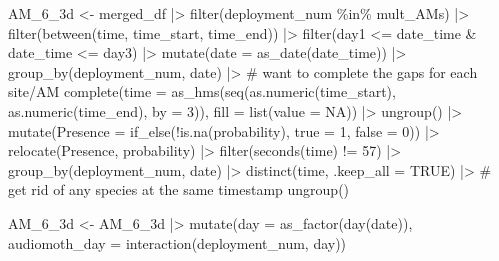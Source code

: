\documentclass[
  letterpaper,
  DIV=11,
  numbers=noendperiod]{scrartcl}
\newenvironment{Shaded}{\begin{snugshade}}{\end{snugshade}}
\newcommand{\AttributeTok}[1]{\textcolor[rgb]{0.40,0.45,0.13}{#1}}
\newcommand{\CommentTok}[1]{\textcolor[rgb]{0.37,0.37,0.37}{#1}}
\newcommand{\ConstantTok}[1]{\textcolor[rgb]{0.56,0.35,0.01}{#1}}
\newcommand{\DecValTok}[1]{\textcolor[rgb]{0.68,0.00,0.00}{#1}}
\newcommand{\FunctionTok}[1]{\textcolor[rgb]{0.28,0.35,0.67}{#1}}
\newcommand{\NormalTok}[1]{\textcolor[rgb]{0.00,0.23,0.31}{#1}}
\newcommand{\OtherTok}[1]{\textcolor[rgb]{0.00,0.23,0.31}{#1}}
\newcommand{\SpecialCharTok}[1]{\textcolor[rgb]{0.37,0.37,0.37}{#1}}
\begin{document}
\begin{Shaded}
\begin{Highlighting}[]
\NormalTok{AM\_6\_3d }\OtherTok{\textless{}{-}}\NormalTok{ merged\_df }\SpecialCharTok{|\textgreater{}} \FunctionTok{filter}\NormalTok{(deployment\_num }\SpecialCharTok{\%in\%}\NormalTok{ mult\_AMs) }\SpecialCharTok{|\textgreater{}} 
  \FunctionTok{filter}\NormalTok{(}\FunctionTok{between}\NormalTok{(time, time\_start, time\_end)) }\SpecialCharTok{|\textgreater{}}
  \FunctionTok{filter}\NormalTok{(day1 }\SpecialCharTok{\textless{}=}\NormalTok{ date\_time }\SpecialCharTok{\&}\NormalTok{ date\_time }\SpecialCharTok{\textless{}=}\NormalTok{ day3) }\SpecialCharTok{|\textgreater{}}
  \FunctionTok{mutate}\NormalTok{(}\AttributeTok{date =} \FunctionTok{as\_date}\NormalTok{(date\_time)) }\SpecialCharTok{|\textgreater{}} 
  \FunctionTok{group\_by}\NormalTok{(deployment\_num, date) }\SpecialCharTok{|\textgreater{}} \CommentTok{\# want to complete the gaps for each site/AM}
  \FunctionTok{complete}\NormalTok{(}\AttributeTok{time =} \FunctionTok{as\_hms}\NormalTok{(}\FunctionTok{seq}\NormalTok{(}\FunctionTok{as.numeric}\NormalTok{(time\_start), }\FunctionTok{as.numeric}\NormalTok{(time\_end), }\AttributeTok{by =} \DecValTok{3}\NormalTok{)), }
  \AttributeTok{fill =} \FunctionTok{list}\NormalTok{(}\AttributeTok{value =} \ConstantTok{NA}\NormalTok{)) }\SpecialCharTok{|\textgreater{}} 
    \FunctionTok{ungroup}\NormalTok{() }\SpecialCharTok{|\textgreater{}} 
    \FunctionTok{mutate}\NormalTok{(}\AttributeTok{Presence =} \FunctionTok{if\_else}\NormalTok{(}\SpecialCharTok{!}\FunctionTok{is.na}\NormalTok{(probability),}
    \AttributeTok{true =} \DecValTok{1}\NormalTok{,}
    \AttributeTok{false =} \DecValTok{0}\NormalTok{)) }\SpecialCharTok{|\textgreater{}} 
      \FunctionTok{relocate}\NormalTok{(Presence, probability) }\SpecialCharTok{|\textgreater{}} 
      \FunctionTok{filter}\NormalTok{(}\FunctionTok{seconds}\NormalTok{(time) }\SpecialCharTok{!=} \DecValTok{57}\NormalTok{) }\SpecialCharTok{|\textgreater{}} 
      \FunctionTok{group\_by}\NormalTok{(deployment\_num, date) }\SpecialCharTok{|\textgreater{}} 
      \FunctionTok{distinct}\NormalTok{(time, }\AttributeTok{.keep\_all =} \ConstantTok{TRUE}\NormalTok{) }\SpecialCharTok{|\textgreater{}} \CommentTok{\# get rid of any species at the same timestamp}
      \FunctionTok{ungroup}\NormalTok{()}

\NormalTok{AM\_6\_3d }\OtherTok{\textless{}{-}}\NormalTok{ AM\_6\_3d }\SpecialCharTok{|\textgreater{}} \FunctionTok{mutate}\NormalTok{(}\AttributeTok{day =} \FunctionTok{as\_factor}\NormalTok{(}\FunctionTok{day}\NormalTok{(date)),}
\AttributeTok{audiomoth\_day =} \FunctionTok{interaction}\NormalTok{(deployment\_num, day))}


\end{Highlighting}
\end{Shaded}
\end{document}
